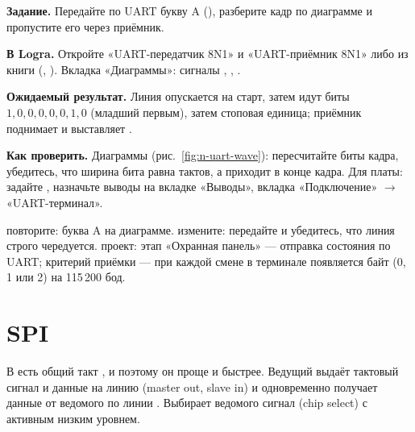 \begin{diybox}
\textbf{Задание.} Передайте по UART букву A (), разберите кадр по диаграмме и пропустите его через приёмник.

\textbf{В Logra.} Откройте «UART-передатчик 8N1» и «UART-приёмник 8N1» либо  из книги (, ). Вкладка «Диаграммы»: сигналы , , .

\textbf{Ожидаемый результат.} Линия опускается на старт, затем идут биты $1,0,0,0,0,0,1,0$ (младший первым), затем стоповая единица; приёмник поднимает  и выставляет .

\textbf{Как проверить.} Диаграммы (рис.~\ref{fig:n-uart-wave}): пересчитайте биты кадра, убедитесь, что ширина бита равна  тактов, а  приходит в конце кадра. Для платы: задайте , назначьте выводы на вкладке «Выводы», вкладка «Подключение» $\to$ «UART-терминал».

 повторите: буква A на диаграмме.  измените: передайте  и убедитесь, что линия строго чередуется.  проект: этап «Охранная панель» --- отправка состояния по UART; критерий приёмки --- при каждой смене  в терминале появляется байт (0, 1 или 2) на 115\,200 бод.
\end{diybox}

\section{SPI}

В  есть общий такт , и поэтому он проще и быстрее. Ведущий
выдаёт тактовый сигнал и данные на линию  (master out, slave in) и
одновременно получает данные от ведомого по линии . Выбирает ведомого
сигнал  (chip select) с активным низким уровнем.

